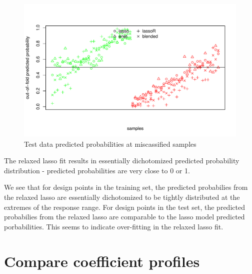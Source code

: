 \documentclass[
]{book}
\begin{document}
\begin{figure}
\centering
\includegraphics{Static/figures/brcaRna-glmnetFit-misclassTest-1.pdf}
\caption{\label{fig:brcaRna-glmnetFit-misclassTest}Test data predicted probabilities at miscassified samples}
\end{figure}

The relaxed lasso fit results in essentially dichotomized predicted probability
distribution - predicted probabilities are very close to 0 or 1.

We see that for design points in the training set, the predicted probabilies from the relaxed lasso
are essentially dichotomized to be tightly distributed at the extremes of the
response range. For design points in the test set, the predicted probabilies from the relaxed lasso
are comparable to the lasso model predicted porbabilities. This seems to indicate over-fitting
in the relaxed lasso fit.

\hypertarget{compare-coefficient-profiles-1}{%
\section{Compare coefficient profiles}\label{compare-coefficient-profiles-1}}
\end{document}
